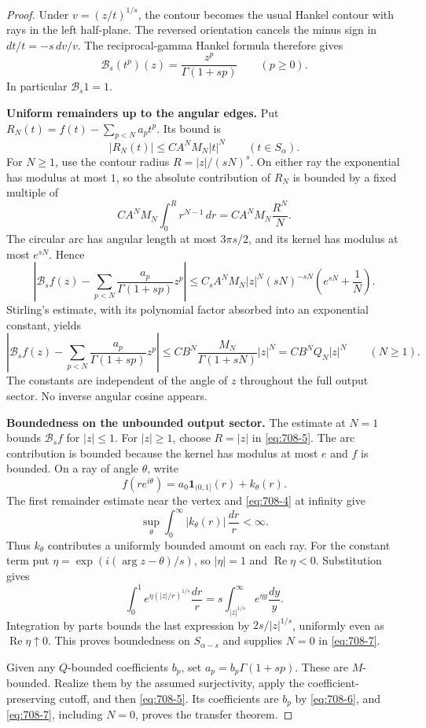 \documentclass[11pt,a4paper]{article}
\theoremstyle{remark}
\begin{document}
\begin{proof}
Under $v=(z/t)^{1/s}$, the contour becomes the usual Hankel contour
with rays in the left half-plane.  The reversed orientation cancels
the minus sign in $dt/t=-s\,dv/v$.  The reciprocal-gamma Hankel formula
therefore gives
\begin{equation}
 \mathcal B_s(t^p)(z)=\frac{z^p}{\Gamma(1+sp)}
 \qquad(p\ge0).
 \label{eq:708-6}
\end{equation}
In particular $\mathcal B_s1=1$.

\par\smallskip\noindent\textbf{Uniform remainders up to the angular edges.}
Put $R_N(t)=f(t)-\sum_{p<N}a_pt^p$.  Its bound is
\[
 |R_N(t)|\le CA^NM_N|t|^N\qquad(t\in S_\alpha).
\]
For $N\ge1$, use the contour radius
$R=|z|/(sN)^s$.  On either ray the exponential has modulus at most
$1$, so the absolute contribution of $R_N$ is bounded by a fixed
multiple of
\[
 CA^NM_N\int_0^R r^{N-1}\,dr
 =CA^NM_N\frac{R^N}{N}.
\]
The circular arc has angular length at most $3\pi s/2$, and its kernel
has modulus at most $e^{sN}$.  Hence
\[
 \left|\mathcal B_sf(z)-
 \sum_{p<N}\frac{a_p}{\Gamma(1+sp)}z^p\right|
 \le C_s A^NM_N|z|^N(sN)^{-sN}
       \left(e^{sN}+\frac1N\right).
\]
Stirling's estimate, with its polynomial factor absorbed into an
exponential constant, yields
\begin{equation}
 \left|\mathcal B_sf(z)-
 \sum_{p<N}\frac{a_p}{\Gamma(1+sp)}z^p\right|
 \le CB^N\frac{M_N}{\Gamma(1+sN)}|z|^N
 =CB^NQ_N|z|^N
 \qquad(N\ge1).
 \label{eq:708-7}
\end{equation}
The constants are independent of the angle of $z$ throughout the full
output sector.  No inverse angular cosine appears.

\par\smallskip\noindent\textbf{Boundedness on the unbounded output sector.}
The estimate at $N=1$ bounds $\mathcal B_sf$ for $|z|\le1$.
For $|z|\ge1$, choose $R=|z|$ in \eqref{eq:708-5}.  The arc contribution is
bounded because the kernel has modulus at most $e$ and $f$ is bounded.
On a ray of angle $\theta$, write
\[
 f(re^{i\theta})=a_0\mathbf1_{(0,1]}(r)+k_\theta(r).
\]
The first remainder estimate near the vertex and \eqref{eq:708-4} at infinity
give
\begin{equation}
 \sup_\theta\int_0^\infty |k_\theta(r)|\,\frac{dr}{r}<\infty.
 \label{eq:708-8}
\end{equation}
Thus $k_\theta$ contributes a uniformly bounded amount on each ray.
For the constant term put
$\eta=\exp(i(\arg z-\theta)/s)$, so $|\eta|=1$ and
$\operatorname{Re}\eta<0$.  Substitution gives
\[
 \int_0^1e^{\eta(|z|/r)^{1/s}}\frac{dr}{r}
 =s\int_{|z|^{1/s}}^\infty e^{\eta y}\frac{dy}{y}.
\]
Integration by parts bounds the last expression by
$2s/|z|^{1/s}$, uniformly even as $\operatorname{Re}\eta\uparrow0$.
This proves boundedness on $S_{\alpha-s}$ and supplies $N=0$ in
\eqref{eq:708-7}.

Given any $Q$-bounded coefficients $b_p$, set
$a_p=b_p\Gamma(1+sp)$.  These are $M$-bounded.
Realize them by the assumed surjectivity, apply the coefficient-preserving
cutoff, and then \eqref{eq:708-5}.  Its coefficients are $b_p$ by \eqref{eq:708-6}, and
\eqref{eq:708-7}, including $N=0$, proves the transfer theorem.
\end{proof}
\end{document}
